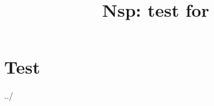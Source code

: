 \documentclass[11pt]{book}
\title{Nsp: test for \manname}
\def\dir{../}
\begin{document}
\maketitle


\chapter{Test}

 \dir \manname
\end{document}
